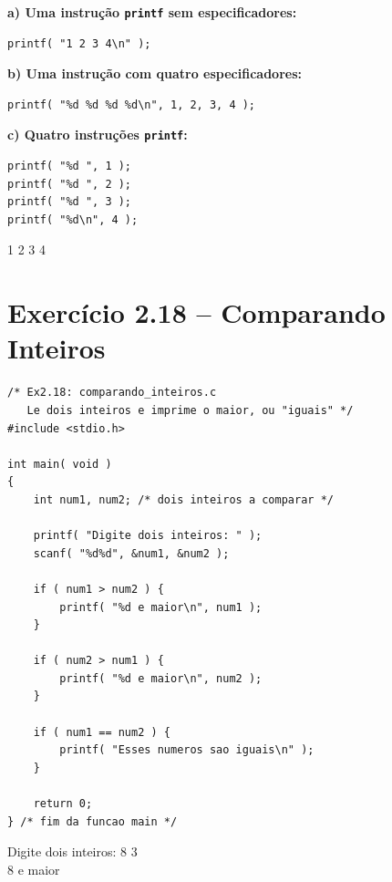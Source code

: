 \documentclass[12pt,a4paper]{article}
\begin{document}
\begin{respostabox}[title={Exercício 2.17 -- Três métodos para imprimir 1 2 3 4}]

\textbf{a) Uma instrução \texttt{printf} sem especificadores:}
\begin{lstlisting}
printf( "1 2 3 4\n" );
\end{lstlisting}

\textbf{b) Uma instrução com quatro especificadores:}
\begin{lstlisting}
printf( "%d %d %d %d\n", 1, 2, 3, 4 );
\end{lstlisting}

\textbf{c) Quatro instruções \texttt{printf}:}
\begin{lstlisting}
printf( "%d ", 1 );
printf( "%d ", 2 );
printf( "%d ", 3 );
printf( "%d\n", 4 );
\end{lstlisting}
\begin{saida}
1 2 3 4
\end{saida}
\end{respostabox}

\section{Exercício 2.18 -- Comparando Inteiros}

\begin{respostabox}[title={Exercício 2.18 -- Comparar dois inteiros}]
\begin{lstlisting}
/* Ex2.18: comparando_inteiros.c
   Le dois inteiros e imprime o maior, ou "iguais" */
#include <stdio.h>

int main( void )
{
    int num1, num2; /* dois inteiros a comparar */

    printf( "Digite dois inteiros: " );
    scanf( "%d%d", &num1, &num2 );

    if ( num1 > num2 ) {
        printf( "%d e maior\n", num1 );
    }

    if ( num2 > num1 ) {
        printf( "%d e maior\n", num2 );
    }

    if ( num1 == num2 ) {
        printf( "Esses numeros sao iguais\n" );
    }

    return 0;
} /* fim da funcao main */
\end{lstlisting}

\begin{saida}
Digite dois inteiros: 8 3\\
8 e maior
\end{saida}
\end{respostabox}
\end{document}
